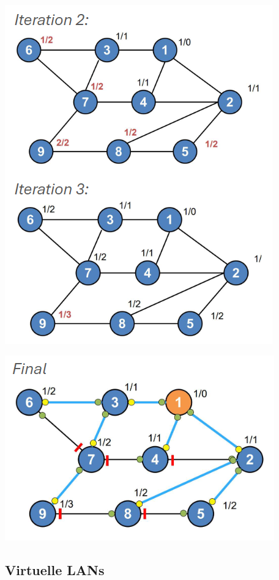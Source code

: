 \begin{example}
\begin{minipage}{0.48\linewidth}
        \includegraphics[width=1\linewidth]{images/rapid_spanning_tree2.png}
    \end{minipage}
    \begin{center}
    \includegraphics[width=0.55\linewidth]{images/rapid_spanning_tree3.png}
    \end{center}
\end{example}

\columnbreak

\subsection{Virtuelle LANs}


